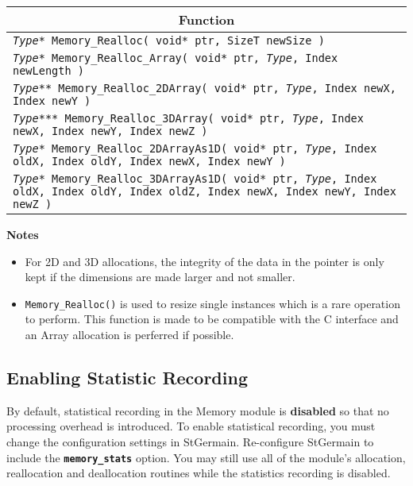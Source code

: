\documentclass[a4paper,12pt]{article}
\begin{document}
\begin{table}[h]
  \begin{tabular}{|p{13.3cm}|}
    \hline \multicolumn{1}{|c|}{\textbf{Function}} \\ \hline
    \texttt{\textit{Type}* Memory\_Realloc( void* ptr, SizeT newSize )} \\ \hline
    \texttt{\textit{Type}* Memory\_Realloc\_Array( void* ptr, \textit{Type}, Index newLength )} \\ \hline
    \texttt{\textit{Type}** Memory\_Realloc\_2DArray( void* ptr, \textit{Type}, Index newX, Index newY )} \\ \hline
    \texttt{\textit{Type}*** Memory\_Realloc\_3DArray( void* ptr, \textit{Type}, Index newX, Index newY, Index newZ )} \\ \hline
    \texttt{\textit{Type}* Memory\_Realloc\_2DArrayAs1D( void* ptr, \textit{Type}, Index oldX, Index oldY, Index newX, Index newY )} \\ \hline
    \texttt{\textit{Type}* Memory\_Realloc\_3DArrayAs1D( void* ptr, \textit{Type}, Index oldX, Index oldY, Index oldZ, Index newX, Index newY, Index newZ )} \\ \hline
  \end{tabular}
\end{table}

{\bf Notes}
\begin{itemize}
\item For 2D and 3D allocations, the integrity of the data in the pointer is only kept if the dimensions are made larger and not smaller.
\item \texttt{Memory\_Realloc()} is used to resize single instances which is a rare operation to perform. This function is made to be compatible with the C interface and an Array allocation is perferred if possible.
\end{itemize}

\subsection{Enabling Statistic Recording}
By default, statistical recording in the Memory module is {\bf disabled} so that no processing overhead is introduced. To enable statistical recording, you must change the configuration settings in StGermain. Re-configure StGermain to include the \texttt{\textbf{memory\_stats}} option. You may still use all of the module's allocation, reallocation and deallocation routines while the statistics recording is disabled.
\end{document}
